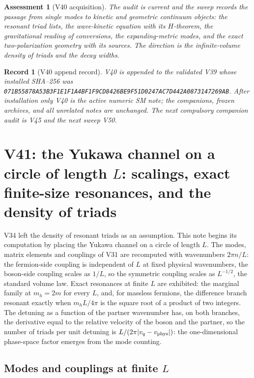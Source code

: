 \documentclass[11pt]{article}
\newtheorem{assessment}[theorem]{Assessment}
\newtheorem{record}[theorem]{Record}
\theoremstyle{remark}
\begin{document}
\begin{assessment}[V40 acquisition]
\label{ass:v20v40}
The audit is current and the sweep records the passage from single
modes to kinetic and geometric continuum objects: the resonant
triad lists, the wave-kinetic equation with its \(H\)-theorem, the
gravitational reading of conversions, the expanding-metric modes,
and the exact two-polarization geometry with its sources.  The
direction is the infinite-volume density of triads and the decay
widths.
\end{assessment}

\begin{record}[V40 append record]
\label{rec:v20v40}
V40 is appended to the validated V39 whose installed SHA--256 was
\texttt{071B55878A53B3F1E1F1A4BF1F9CD8426BE9F51D0247AC7D442A0873147269AB}.
After installation only V40 is the active numeric SM note; the
companions, frozen archives, and all unrelated notes are unchanged.
The next compulsory companion audit is V45 and the next sweep V50.
\end{record}


\section{V41: the Yukawa channel on a circle of length \texorpdfstring{$L$}{L}: scalings, exact finite-size resonances, and the density of triads}
\label{sec:v20v41}

V34 left the density of resonant triads as an assumption.  This
note begins its computation by placing the Yukawa channel on a
circle of length \(L\).  The modes, matrix elements and couplings of
V31 are recomputed with wavenumbers \(2\pi n/L\): the fermion-side
coupling is independent of \(L\) at fixed physical wavenumbers, the
boson-side coupling scales as \(1/L\), so the symmetric coupling
scales as \(L^{-1/2}\), the standard volume law.  Exact resonances
at finite \(L\) are exhibited: the marginal family at \(m_h=2m\) for
every \(L\), and, for massless fermions, the difference branch
resonant exactly when \(m_hL/4\pi\) is the square root of a product
of two integers.  The detuning as a function of the partner
wavenumber has, on both branches, the derivative equal to the
relative velocity of the boson and the partner, so the number of
triads per unit detuning is \(L/(2\pi|v_q-v_{\rm phys}|)\): the
one-dimensional phase-space factor emerges from the mode counting.

\subsection{Modes and couplings at finite \texorpdfstring{$L$}{L}}
\end{document}
